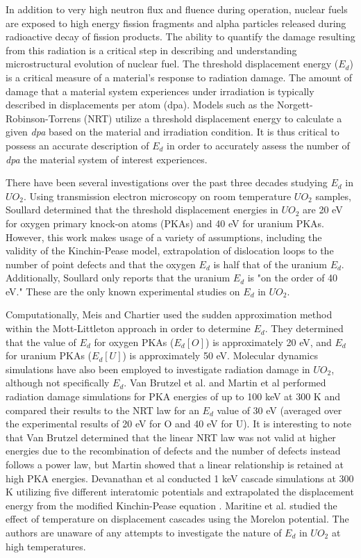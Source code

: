\documentclass[8pt]{article}   	%
\begin{document}
In addition to very high neutron flux and fluence during operation, nuclear fuels are exposed to high energy fission fragments and alpha particles released during radioactive decay of fission products. The ability to quantify the damage resulting from this radiation is a critical step in describing and understanding microstructural evolution of nuclear fuel. The threshold displacement energy ($E_d$) is a critical measure of a material's response to radiation damage. The amount of damage that a material system experiences under irradiation is typically described in displacements per atom (dpa).  Models such as the Norgett-Robinson-Torrens (NRT) \cite{nrt} utilize a threshold displacement energy to calculate a given \textit{dpa} based on the material and irradiation condition.  It is thus critical to possess an accurate description of $E_d$ in order to accurately assess the number of \textit{dpa} the material system of interest experiences. 

There have been several investigations over the past three decades studying $E_d$ in $UO_2$. Using transmission electron microscopy on room temperature $UO_2$ samples, Soullard \cite{soullard1977,soullard1985} determined that the threshold displacement energies in $UO_2$ are 20 eV for oxygen primary knock-on atoms (PKAs) and 40 eV for uranium PKAs. However, this work makes usage of a variety of assumptions, including the validity of the Kinchin-Pease model, extrapolation of dislocation loops to the number of point defects and that the oxygen $E_d$ is half that of the uranium $E_d$. Additionally, Soullard only reports that the uranium $E_d$ is "on the order of 40 eV." These are the only known experimental studies on $E_d$ in $UO_2$. 

Computationally, Meis and Chartier \cite{meis2005} used the sudden approximation method within the Mott-Littleton approach \cite{Litt} in order to determine $E_d$. They determined that the value of $E_d$ for oxygen PKAs ($E_d [O]$) is approximately 20 eV, and $E_d$ for uranium PKAs ($E_d [U]$) is approximately 50 eV. Molecular dynamics simulations have also been employed to investigate radiation damage in $UO_2$, although not specifically $E_d$. Van Brutzel et al.\cite{vanbrutzel2003,vanbrutzel2006} and Martin et al \cite{martin2011} performed radiation damage simulations for PKA energies of up to 100 keV at 300 K and compared their results to the NRT law for an $E_d$ value of 30 eV (averaged over the experimental results of 20 eV for O and 40 eV for U). It is interesting to note that Van Brutzel determined that the linear NRT law was not valid at higher energies due to the recombination of defects and the number of defects instead follows a power law, but Martin showed that a linear relationship is retained at high PKA energies. Devanathan et al \cite{devanathan2009} conducted 1 keV cascade simulations at 300 K utilizing five different interatomic potentials and extrapolated the displacement energy from the modified Kinchin-Pease equation \cite{kinchinpease}. Maritine et al. \cite{martin2015, martin2014} studied the effect of temperature on displacement cascades using the Morelon \cite{morelon2003} potential. The authors are unaware of any attempts to investigate the nature of $E_d$ in $UO_2$ at high temperatures.
\end{document}
